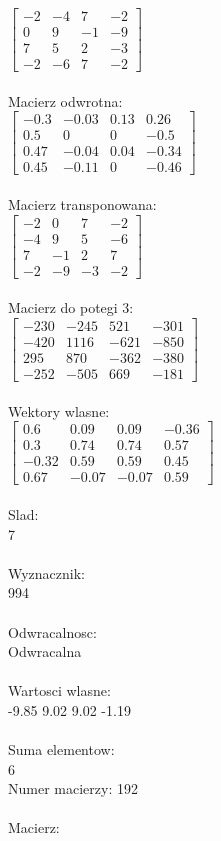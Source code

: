 \documentclass[a4paper,12pt]{article}
\begin{document}
$\begin{bmatrix} -2&-4&7&-2\\0&9&-1&-9\\7&5&2&-3\\-2&-6&7&-2 \end{bmatrix}$
\\
\\
Macierz odwrotna:\\

$\begin{bmatrix} -0.3&-0.03&0.13&0.26\\0.5&0&0&-0.5\\0.47&-0.04&0.04&-0.34\\0.45&-0.11&0&-0.46 \end{bmatrix}$
\\
\\
Macierz transponowana:\\

$\begin{bmatrix} -2&0&7&-2\\-4&9&5&-6\\7&-1&2&7\\-2&-9&-3&-2 \end{bmatrix}$
\\
\\
Macierz do potegi 3:\\

$\begin{bmatrix} -230&-245&521&-301\\-420&1116&-621&-850\\295&870&-362&-380\\-252&-505&669&-181 \end{bmatrix}$
\\
\\
Wektory wlasne:\\

$\begin{bmatrix} 0.6&0.09&0.09&-0.36\\0.3&0.74&0.74&0.57\\-0.32&0.59&0.59&0.45\\0.67&-0.07&-0.07&0.59 \end{bmatrix}$
\\
\\
Slad:\\
7
\\
\\
Wyznacznik:\\
994
\\
\\
Odwracalnosc:\\
Odwracalna
\\
\\
Wartosci wlasne:\\
-9.85 9.02 9.02 -1.19
\\
\\
Suma elementow:\\
6
\\
\newpage
Numer macierzy:
192
\\
\\
Macierz:\\
\end{document}
